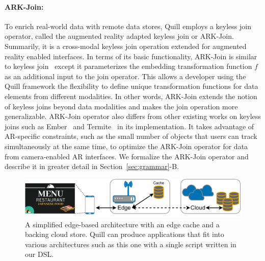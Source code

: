 \documentclass[11pt]{article}
\begin{document}
\paragraph{ARK-Join:}
\label{sec:background:ark}
To enrich real-world data with remote data stores, Quill employs a keyless join operator, called the augmented reality adapted keyless join or ARK-Join. Summarily, it is a cross-modal keyless join operation extended for augmented reality enabled interfaces. In terms of its basic functionality, ARK-Join is similar to keyless join~\cite{fernandez2019termite, suri2021ember} except it parameterizes the embedding transformation function $f$ as an additional input to the join operator. This allows a developer using the Quill framework the flexibility to define unique transformation functions for data elements from different modalities. %
In other words, ARK-Join extends the notion of keyless joins beyond data modalities and makes the join operation more generalizable. ARK-Join operator also differs from other existing works on keyless joins such as Ember~\cite{suri2021ember} and Termite~\cite{fernandez2019termite} in its implementation. It takes advantage of AR-specific constraints, such as the small number of objects that users can track simultaneously at the same time, to optimize the ARK-Join operator for data from camera-enabled AR interfaces. We formalize the ARK-Join operator and describe it in greater detail in Section~\ref{sec:grammar}-B.

\begin{figure}
  \centering
  \includegraphics[width=\linewidth]{figs/edge-cache.pdf}
  \caption{A simplified edge-based architecture with an edge cache and a backing cloud store. Quill can produce applications that fit into various architectures such as this one with a single script written in our DSL.}
  \label{fig:edge-cache}
\end{figure}
\end{document}
